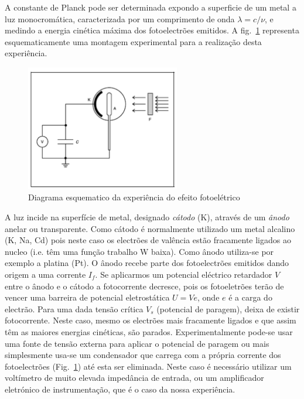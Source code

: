 \documentclass[a4paper,12pt]{article}  %
\begin{document}

A constante de Planck pode ser determinada expondo a superficie de um metal a luz monocromática, caracterizada por um comprimento de onda $\lambda=c /\nu$, e medindo a energia cinética máxima dos fotoelectrões emitidos. A fig.~\ref{fig:plack_exp} representa esquematicamente uma montagem experimental para a realização desta experiência.

\begin{figure}[htb] 
	\centering 
	\includegraphics[width=0.6\textwidth]{planck_exp} 
	\caption{Diagrama esquematico da experiência do efeito fotoelétrico} \label{fig:plack_exp}
\end{figure}


A luz incide na superfície de metal, designado \emph{cátodo} (K), através de um \emph{ânodo} anelar ou transparente. 
Como cátodo é normalmente utilizado um metal alcalino (K, Na, Cd)  pois neste caso os electrões de valência estão fracamente 
ligados ao nucleo (i.e. têm uma função trabalho W baixa). Como ânodo utiliza-se por exemplo a platina  (Pt). 
O ânodo recebe parte dos fotoelectrões emitidos dando origem a uma corrente $I_f$. 
Se aplicarmos um potencial eléctrico retardador $V$ entre o ânodo e o cátodo a fotocorrente decresce, pois os fotoeletrões terão de vencer uma barreira de  potencial eletrostática $U=V e$, onde $e$ é a carga do electrão. 
Para uma dada tensão crítica $V_s$ (potencial de paragem), deixa de existir fotocorrente. Neste caso, mesmo os electrões mais fracamente ligados e que assim têm as maiores energias cinéticas, são parados. 
Experimentalmente pode-se usar uma fonte de tensão externa para aplicar o potencial de paragem ou mais simplesmente usa-se um condensador que carrega com a própria corrente dos fotoelectrões (Fig.~\ref{fig:plack_exp}) até esta ser eliminada. Neste caso é necessário utilizar um voltímetro de muito elevada impedância de entrada, ou um amplificador eletrónico de instrumentação, que é o caso da nossa experiência.
\end{document}
